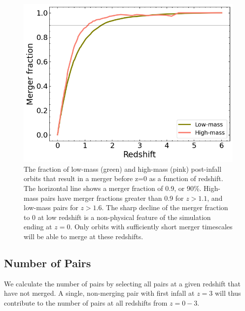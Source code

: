 \documentclass[twocolumn,linenumbers]{aastex631}
\begin{document}
\begin{figure}[htb]
    \begin{center}
    \includegraphics[width=\columnwidth]{plots/bet-on-it/6_mergerfraction.png}
    \caption{The fraction of low-mass (green) and high-mass (pink) post-infall orbits that result in a merger before z=0 as a function of redshift. 
    The horizontal line shows a merger fraction of 0.9, or 90\%. 
    High-mass pairs have merger fractions greater than 0.9 for $z>1.1$, and low-mass pairs for $z>1.6$.
    The sharp decline of the merger fraction to 0 at low redshift is a non-physical feature of the simulation ending at $z=0$.
    Only orbits with sufficiently short merger timescales will be able to merge at these redshifts.}
    \label{fig:fmerge}
    \end{center}
\end{figure}

\subsection{Number of Pairs}
We calculate the number of pairs by selecting all pairs at a given redshift that have not merged.
A single, non-merging pair with first infall at $z=3$ will thus contribute to the number of pairs at all redshifts from $z=0-3$. 
\end{document}
